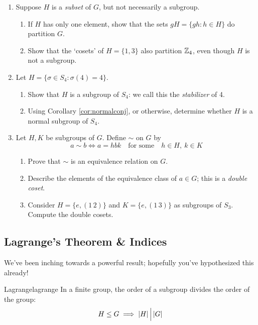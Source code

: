 \begin{exercises}{}{}
\begin{enumerate}
	  
	  \item\label{exs:partitioncoset} Suppose $H$ is a \emph{subset} of $G$, but not necessarily a subgroup.
	  \begin{enumerate}
	    \item If $H$ has only one element, show that the sets $gH=\{gh:h\in H\}$ do partition $G$.
	    \item Show that the `cosets' of $H=\{1,3\}$ also partition $\mathbb{Z}_4$, even though $H$ is not a subgroup.
	  \end{enumerate}
	  
	
		\item Let $H=\{\sigma\in S_4:\sigma(4)=4\}$.
		\begin{enumerate}
		  \item Show that $H$ is a subgroup of $S_4$: we call this the \emph{stabilizer} of 4.
		  \item Using Corollary \ref{cor:normalconj}, or otherwise, determine whether $H$ is a normal subgroup of $S_4$.
		\end{enumerate}
	  
		
		\item Let $H,K$ be subgroups of $G$. Define $\sim$ on $G$ by
		\[
			a\sim b\iff a=hbk\quad\text{for some}\quad h\in H,\ k\in K
		\]
		\begin{enumerate}
	  	\item Prove that $\sim$ is an equivalence relation on $G$.
	  	\item Describe the elements of the equivalence class of $a\in G$; this is a \emph{double coset}.
	  	\item Consider $H=\{e,(1\,2)\}$ and $K=\{e,(1\,3)\}$ as subgroups of $S_3$. Compute the double cosets.
		\end{enumerate}
	\end{enumerate}
\end{exercises}


\clearpage


\subsection{Lagrange's Theorem \& Indices}\label{sec:lagrange}


We've been inching towards a powerful result; hopefully you've hypothesized this already!

\begin{thm}{Lagrange}{lagrange}
	In a finite group, the order of a subgroup divides the order of the group:\footnotemark
	\[
		H\le G\implies \left| H\right|\Big\vert \left| G\right|
	\]
\end{thm}


